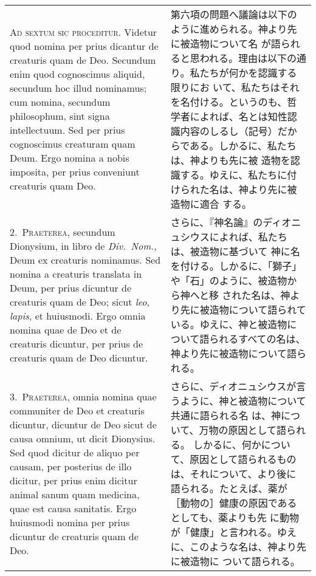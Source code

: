 \documentclass[10pt]{jsarticle} %
\begin{document}
\begin{longtable}{p{21em}p{21em}}
{\huge A}{\scshape d sextum sic proceditur}. Videtur quod
 nomina per prius dicantur de creaturis quam de Deo. Secundum enim quod
 cognoscimus aliquid, secundum hoc illud nominamus; cum nomina, secundum
 philosophum, sint signa intellectuum. Sed per prius cognoscimus
 creaturam quam Deum. Ergo nomina a nobis imposita, per prius conveniunt
 creaturis quam Deo.

&


第六項の問題へ議論は以下のように進められる。神より先に被造物について名
が語られると思われる。理由は以下の通り。私たちが何かを認識する限りにお
いて、私たちはそれを名付ける。というのも、哲学者によれば、名とは知性認
識内容のしるし（記号）だからである。しかるに、私たちは、神よりも先に被
造物を認識する。ゆえに、私たちに付けられた名は、神より先に被造物に適合
する。

\\

2.~{\scshape Praeterea}, secundum Dionysium, in libro de {\itshape
 Div.~Nom.}, Deum ex creaturis nominamus. Sed nomina a creaturis
 translata in Deum, per prius dicuntur de creaturis quam de Deo; sicut
 {\itshape leo}, {\itshape lapis}, et huiusmodi. Ergo omnia nomina quae
 de Deo et de creaturis dicuntur, per prius de creaturis quam de Deo
 dicuntur.

&

さらに、『神名論』のディオニュシウスによれば、私たちは、被造物に基づいて
 神に名を付ける。しかるに、「獅子」や「石」のように、被造物から神へと移
 された名は、神より先に被造物について語られている。ゆえに、神と被造物に
 ついて語られるすべての名は、神より先に被造物について語られる。


\\

3.~{\scshape Praeterea}, omnia nomina quae communiter de
 Deo et creaturis dicuntur, dicuntur de Deo sicut de causa omnium, ut
 dicit Dionysius. Sed quod dicitur de aliquo per causam, per posterius
 de illo dicitur, per prius enim dicitur animal sanum quam medicina,
 quae est causa sanitatis. Ergo huiusmodi nomina per prius dicuntur de
 creaturis quam de Deo.

&
さらに、ディオニュシウスが言うように、神と被造物について共通に語られる名
 は、神について、万物の原因として語られる。
しかるに、何かについて、原因として語られるものは、それについて、より後に
 語られる。たとえば、薬が［動物の］健康の原因であるとしても、薬よりも先
 に動物が「健康」と言われる。ゆえに、このような名は、神より先に被造物に
 ついて語られる。


\end{longtable}
\end{document}
